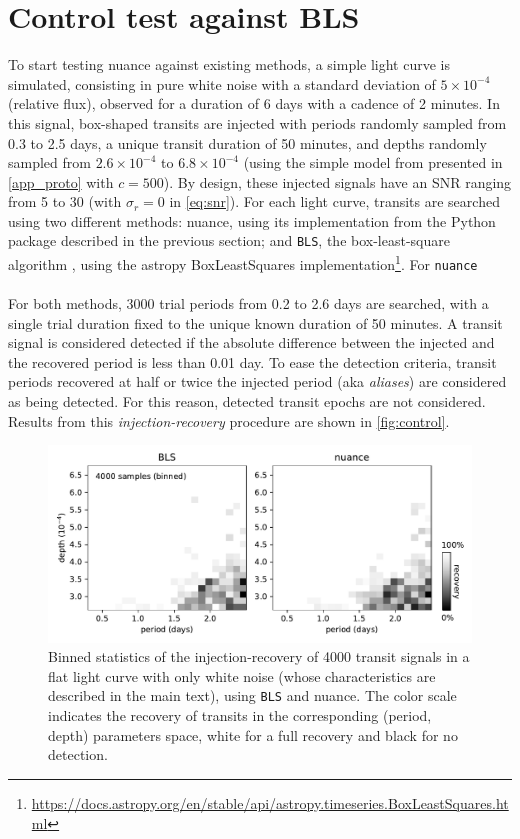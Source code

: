 \documentclass{aastex631}
\newcommand{\nuance}{\texttt{nuance}}
\newcommand{\footlink}[1]{\footnote{\url{#1}}}
\begin{document}
\section{Control test against BLS}\label{control}

To start testing \textsf{nuance} against existing methods, a simple light curve is simulated, consisting in pure white noise with a standard deviation of $5\times 10^{-4}$ (relative flux), observed for a duration of 6 days with a cadence of 2 minutes.
In this signal, box-shaped transits are injected with periods randomly sampled from 0.3 to 2.5 days, a unique transit duration of 50 minutes, and depths randomly sampled from $2.6 \times 10^{-4}$ to $6.8 \times 10^{-4}$ (using the simple model from \cite{protopapas} presented in \autoref{app_proto} with $c=500$). By design, these injected signals have an SNR ranging from 5 to 30 (with $\sigma_r = 0$ in \autoref{eq:snr}). For each light curve, transits are searched using two different methods: \textsf{nuance}, using its implementation from the Python package described in the previous section; and \texttt{BLS}, the box-least-square algorithm \citep{bls}, using the \textsf{astropy} \textsf{BoxLeastSquares} implementation\footlink{https://docs.astropy.org/en/stable/api/astropy.timeseries.BoxLeastSquares.html}. For \nuance{}\\\\
For both methods, 3000 trial periods from 0.2 to 2.6 days are searched, with a single trial duration fixed to the unique known duration of 50 minutes. A transit signal is considered detected if the absolute difference between the injected and the recovered period is less than 0.01 day. To ease the detection criteria, transit periods recovered at half or twice the injected period (aka \textit{aliases}) are considered as being detected. For this reason, detected transit epochs are not considered. Results from this \textit{injection-recovery} procedure are shown in \autoref{fig:control}.

\begin{figure}[H]
    \begin{centering}
        \includegraphics[width=0.85\linewidth]{../workflows/sanity/figures/control_test.pdf}
        \caption{Binned statistics of the injection-recovery of 4000 transit signals in a flat light curve with only white noise (whose characteristics are described in the main text), using \texttt{BLS} and \textsf{nuance}. The color scale indicates the recovery of transits in the corresponding (period, depth) parameters space, white for a full recovery and black for no detection.}
        \label{fig:control}
    \end{centering}
\end{figure}
\end{document}
